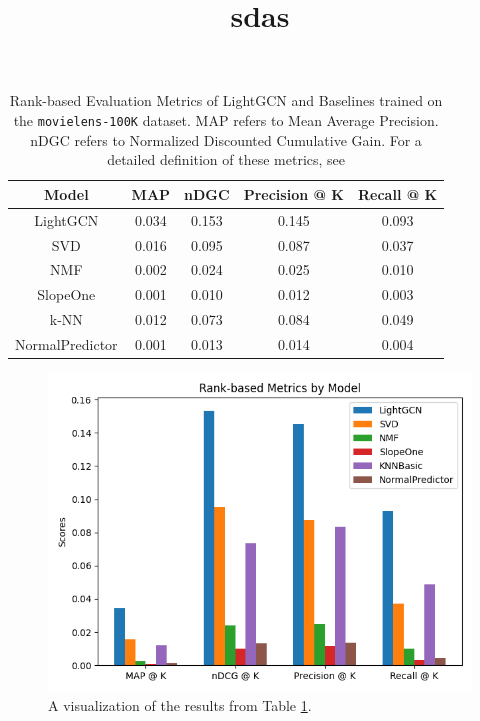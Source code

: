 \documentclass{article}
\begin{document}
\begin{table}[H]
    \centering
        \begin{tabular}{|c c c c c|} 
         \hline
         Model & MAP & nDGC & Precision @ K & Recall @ K \\ [0.5ex] 
         \hline\hline
         LightGCN & 0.034 & 0.153 & 0.145 & 0.093 \\ 
         \hline
         SVD & 0.016 & 0.095 & 0.087 & 0.037 \\
         \hline
         NMF & 0.002 & 0.024 & 0.025 & 0.010 \\ 
         \hline
         SlopeOne & 0.001 & 0.010 & 0.012 & 0.003 \\ 
         \hline
         k-NN & 0.012 & 0.073 & 0.084 & 0.049 \\ 
         \hline 
         NormalPredictor & 0.001 & 0.013 & 0.014 & 0.004 \\[1ex] 
         \hline
        \end{tabular}
    \title{sdas}
    \caption{Rank-based Evaluation Metrics of LightGCN and Baselines trained on the \texttt{movielens-100K} dataset. MAP refers to Mean Average Precision. nDGC refers to Normalized Discounted Cumulative Gain. For a detailed definition of these metrics, see \cite{metrics}}
    \label{tab:lightgcn-100k-results}
\end{table}

\begin{figure}
    \centering
    \includegraphics[width=.8\textwidth]{figs/lightgcn-movielens100k-eval.png}
    \caption{A visualization of the results from Table \ref{tab:lightgcn-100k-results}.}
    \label{fig:lightgcn-100k-eval}
\end{figure}
\end{document}
